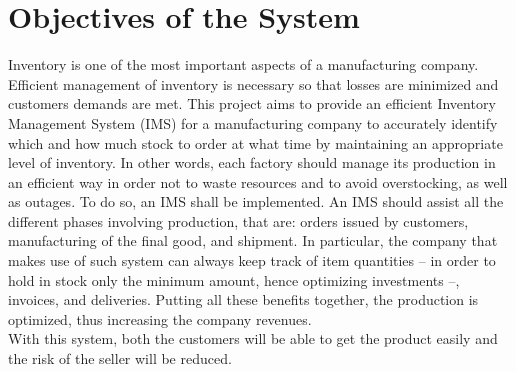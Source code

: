 \section{Objectives of the System}
Inventory is one of the most important aspects of a manufacturing company. Efficient management of inventory is necessary so that losses are minimized and customers demands are met. This project aims to provide an efficient Inventory Management System (IMS) for a manufacturing company to accurately identify which and how much stock to order at what time by maintaining an appropriate level of inventory. In other words, each factory should manage its production in an efficient way in order not to waste resources and to avoid overstocking, as well as outages. To do so, an IMS shall be implemented. An IMS should assist all the different phases involving production, that are: orders issued by customers, manufacturing of the final good, and shipment. In particular, the company that makes use of such system can always keep track of item quantities -- in order to hold in stock only the minimum amount, hence optimizing investments --, invoices, and deliveries. Putting all these benefits together, the production is optimized, thus increasing the company revenues.\\
With this system, both the customers will be able to get the product easily and the risk of the seller will be reduced.